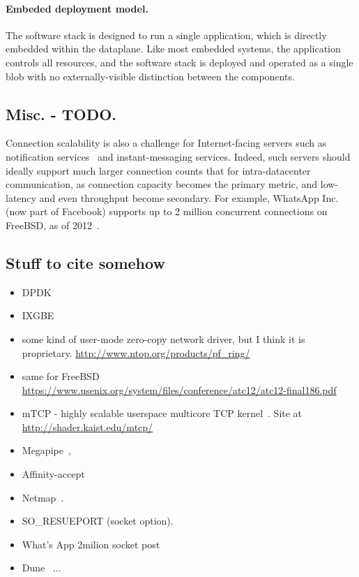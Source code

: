 \paragraph{Embeded deployment model.} 

The software stack is designed to run a single
application, which is directly embedded within the dataplane.  Like
most embedded systems, the application controls all resources, and the
software stack is deployed and operated as a single blob with no
externally-visible distinction between the components.




\subsection{Misc. - TODO.}

Connection scalability is also a challenge for Internet-facing servers
such as notification services~\cite{DBLP:conf/sosp/AdyaCMP11} and
instant-messaging services.  Indeed, such servers should ideally
support much larger connection counts that for intra-datacenter
communication, as connection capacity becomes the primary metric, and
low-latency and even throughput become secondary.  For example,
WhatsApp Inc. (now part of Facebook) supports up to 2 million
concurrent connections on FreeBSD, as of 2012~\cite{whatsapp-2mil}.





\subsection{Stuff to cite somehow}
\begin{itemize}


\item DPDK
\item IXGBE
\item some kind of user-mode zero-copy network driver, but I think it is proprietary. \url{http://www.ntop.org/products/pf_ring/}
\item same for FreeBSD \url{https://www.usenix.org/system/files/conference/atc12/atc12-final186.pdf}
\item mTCP - highly scalable userspace multicore TCP kernel~\cite{jeong2014mtcp}.  Site at \url{http://shader.kaist.edu/mtcp/}
\item Megapipe~\cite{han2012megapipe},
\item Affinity-accept~\cite{DBLP:conf/eurosys/PesterevSZM12}
\item Netmap~\cite{rizzo2012netmap}.
\item SO\_RESUEPORT (socket option).  
\item What's App 2milion socket post~\cite{whatsapp-2mil}
\item Dune~\cite{belay2012dune} ...
\end{itemize}

